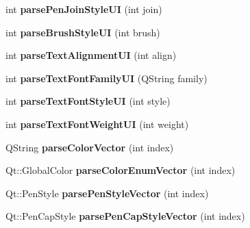 \begin{DoxyCompactItemize}
\item 
\hypertarget{classMainWindow_a27444b31b06ddeae8a5b472424e59dc7}{int {\bfseries parse\-Pen\-Join\-Style\-U\-I} (int join)}\label{classMainWindow_a27444b31b06ddeae8a5b472424e59dc7}

\item 
\hypertarget{classMainWindow_aa69b2b972c2658c310a8b47f9fd6635a}{int {\bfseries parse\-Brush\-Style\-U\-I} (int brush)}\label{classMainWindow_aa69b2b972c2658c310a8b47f9fd6635a}

\item 
\hypertarget{classMainWindow_a6eede817865dc9a7369e7720b6cff57e}{int {\bfseries parse\-Text\-Alignment\-U\-I} (int align)}\label{classMainWindow_a6eede817865dc9a7369e7720b6cff57e}

\item 
\hypertarget{classMainWindow_a52edca2086fe0c10b13694310b100d19}{int {\bfseries parse\-Text\-Font\-Family\-U\-I} (Q\-String family)}\label{classMainWindow_a52edca2086fe0c10b13694310b100d19}

\item 
\hypertarget{classMainWindow_a05de1cbcef8468aa63dddf0db30ae923}{int {\bfseries parse\-Text\-Font\-Style\-U\-I} (int style)}\label{classMainWindow_a05de1cbcef8468aa63dddf0db30ae923}

\item 
\hypertarget{classMainWindow_ad213c2853bcd6f565550755ac3f96076}{int {\bfseries parse\-Text\-Font\-Weight\-U\-I} (int weight)}\label{classMainWindow_ad213c2853bcd6f565550755ac3f96076}

\item 
\hypertarget{classMainWindow_a256028663ce4b779f8157dd776a01ca1}{Q\-String {\bfseries parse\-Color\-Vector} (int index)}\label{classMainWindow_a256028663ce4b779f8157dd776a01ca1}

\item 
\hypertarget{classMainWindow_a4ca5d652e16019c67a1c0d3f9f66cae0}{Qt\-::\-Global\-Color {\bfseries parse\-Color\-Enum\-Vector} (int index)}\label{classMainWindow_a4ca5d652e16019c67a1c0d3f9f66cae0}

\item 
\hypertarget{classMainWindow_ade23bd14a9ed0e4b8df36a5d7611764f}{Qt\-::\-Pen\-Style {\bfseries parse\-Pen\-Style\-Vector} (int index)}\label{classMainWindow_ade23bd14a9ed0e4b8df36a5d7611764f}

\item 
\hypertarget{classMainWindow_a189864a460a6cf0201f6788dcaa9d2ce}{Qt\-::\-Pen\-Cap\-Style {\bfseries parse\-Pen\-Cap\-Style\-Vector} (int index)}\label{classMainWindow_a189864a460a6cf0201f6788dcaa9d2ce}


\end{DoxyCompactItemize}
